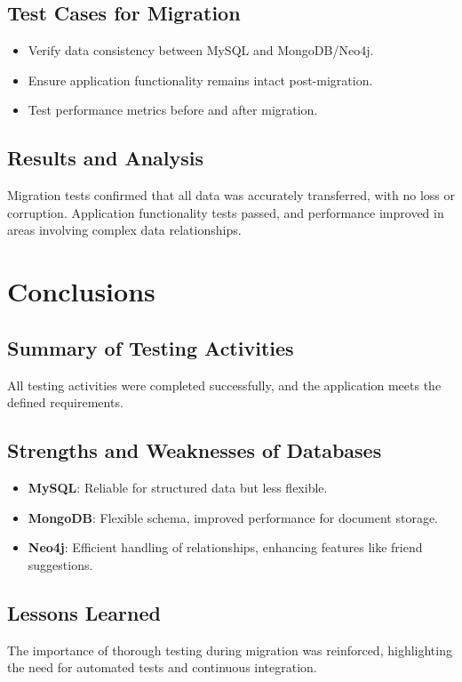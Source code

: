 \documentclass[12pt,a4paper]{report}
\begin{document}
\section{Test Cases for Migration}
\begin{itemize}
    \item Verify data consistency between MySQL and MongoDB/Neo4j.
    \item Ensure application functionality remains intact post-migration.
    \item Test performance metrics before and after migration.
\end{itemize}

\section{Results and Analysis}
Migration tests confirmed that all data was accurately transferred, with no loss or corruption. Application functionality tests passed, and performance improved in areas involving complex data relationships.

\chapter{Conclusions}
\section{Summary of Testing Activities}
All testing activities were completed successfully, and the application meets the defined requirements.

\section{Strengths and Weaknesses of Databases}
\begin{itemize}
    \item \textbf{MySQL}: Reliable for structured data but less flexible.
    \item \textbf{MongoDB}: Flexible schema, improved performance for document storage.
    \item \textbf{Neo4j}: Efficient handling of relationships, enhancing features like friend suggestions.
\end{itemize}

\section{Lessons Learned}
The importance of thorough testing during migration was reinforced, highlighting the need for automated tests and continuous integration.
\end{document}
